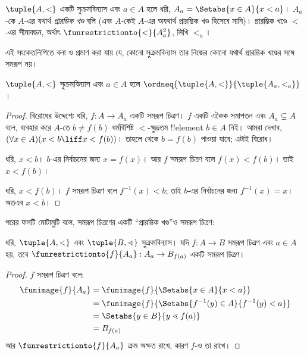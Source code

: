 \documentclass[../../../include/open-logic-section]{subfiles}
\begin{document}
\begin{defn}
$\tuple{A, <}$ একটি সুক্রমবিন্যাস এবং $a \in A$
হলে ধরি, $A_a = \Setabs{x \in A}{x < a}$।
$A_a$-কে $A$-এর যথার্থ \emph{প্রারম্ভিক খণ্ড}
বলি (এবং $A$-কেই $A$-এর অযথার্থ প্রারম্ভিক
খণ্ড হিসেবে মানি)। প্রারম্ভিক খণ্ডে $<$-এর সীমাবদ্ধন,
অর্থাৎ $\funrestrictionto{\mathord{<}}{A_a^2}$,
লিখি $<_a$।
\end{defn}
\noindent
এই সংকেতলিপিতে বলা ও প্রমাণ করা যায় যে,
কোনো সুক্রমবিন্যাস তার নিজের কোনো যথার্থ
প্রারম্ভিক খণ্ডের সঙ্গে সমরূপ নয়।

\begin{lem}
$\tuple{A, <}$ সুক্রমবিন্যাস এবং $a \in A$ হলে
$\ordneq{\tuple{A, <}}{\tuple{A_a, <_a}}$।
\end{lem}

\begin{proof}
বিরোধের উদ্দেশ্যে ধরি, $f \colon A \to A_a$
একটি সমরূপ চিত্রণ। $f$ একটি একৈক সমাপতন এবং
$A_a \subsetneq A$ বলে,
 ব্যবহার করে $A$-তে
$b \neq f(b)$ ধর্মবিশিষ্ট $<$-ক্ষুদ্রতম !!{element}
$b \in A$ নিই। আমরা দেখাব,
$(\forall x \in A)(x<b \liff x < f(b))$।
তাহলে
থেকে $b = f(b)$ পাওয়া যাবে; এটাই বিরোধ।

ধরি, $x < b$। $b$-এর নির্বাচনের জন্য $x = f(x)$।
আর $f$ সমরূপ চিত্রণ বলে $f(x) < f(b)$।
তাই $x < f(b)$।

ধরি, $x < f(b)$। $f$ সমরূপ চিত্রণ বলে
$f^{-1}(x) < b$; তাই $b$-এর নির্বাচনের জন্য
$f^{-1}(x) = x$। অতএব $x < b$।
\end{proof}

পরের ফলটি মোটামুটি বলে, সমরূপ চিত্রণের একটি
``প্রারম্ভিক খণ্ড''ও সমরূপ চিত্রণ:

\begin{lem}
ধরি, $\tuple{A, <}$ এবং $\tuple{B, \lessdot}$
সুক্রমবিন্যাস। যদি $f \colon A \to B$ সমরূপ
চিত্রণ এবং $a \in A$ হয়, তবে
$\funrestrictionto{f}{A_{a}} : A_a \to B_{f(a)}$
একটি সমরূপ চিত্রণ।
\end{lem}

\begin{proof}
$f$ সমরূপ চিত্রণ বলে:
\begin{align*}
	\funimage{f}{A_a} &= \funimage{f}{\Setabs{x \in A}{x < a}}\\
	&= \funimage{f}{\Setabs{f^{-1}(y) \in A}{f^{-1}(y) < a}} \\
	&= \Setabs{y \in B}{y \lessdot f(a)} \\
	&=B_{f(a)}
\end{align*}
আর $\funrestrictionto{f}{A_a}$ ক্রম অক্ষত রাখে,
কারণ $f$-ও তা রাখে।
\end{proof}
\end{document}

